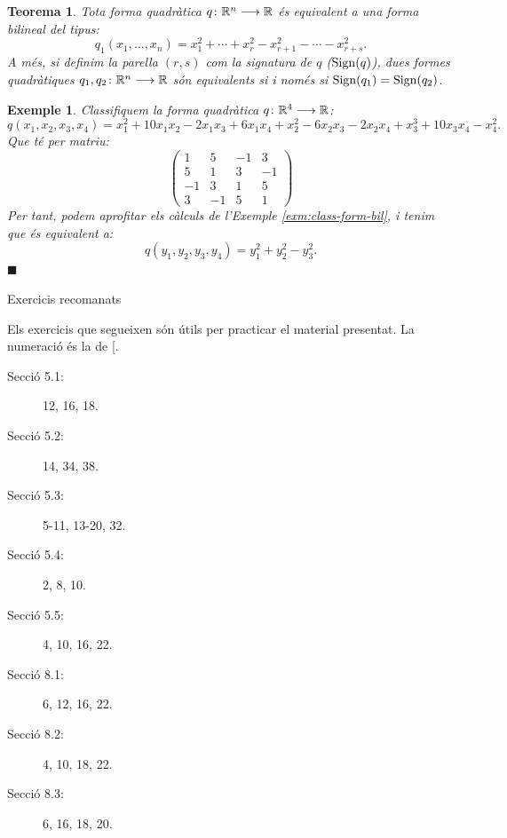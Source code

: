 \documentclass[
  11pt,
]{book}
\makeatletter
\numberwithin{dummy}{section}
\theoremstyle{maincolornumbox}
\newtheorem{theorem}{TTTT}[chapter]
\newtheorem{theoremeT}{Teorema}[chapter]
\theoremstyle{blacknumex}
\newtheorem{exampleT}{Exemple}[chapter]
\theoremstyle{blacknumbox}
\theoremstyle{maincolornum}
\renewenvironment{theorem}{\begin{tBox}\begin{theoremeT}}{\end{theoremeT}\end{tBox}}
\newenvironment{example}{\begin{exampleT}}{\hfill{\tiny\ensuremath{\blacksquare}}\end{exampleT}}
\renewcommand{\section}{\@startsection{section}{1}{\z@}
{-4ex \@plus -1ex \@minus -.4ex}
{1ex \@plus.2ex }
{\normalfont\large\sffamily\bfseries}}
\makeatother
\begin{document}
\begin{theorem}
\protect\hypertarget{thm:class-formQuadR}{}\label{thm:class-formQuadR}Tota forma
quadràtica \(q\colon \mathbb{R}^n\longrightarrow \mathbb{R}\) és equivalent a una forma bilineal del
tipus:
\[q_1(x_1,\dots, x_n)=x_1^2+ \cdots + x_r^2 - x_{r+1}^2-\cdots -x_{r+s}^2 .\]
A més, si definim la parella \((r,s)\) com la \emph{signatura de \(q\)}
(\(\operatorname{Sign}(q)\)), dues formes quadràtiques \(q_1,q_2\colon \mathbb{R}^n\longrightarrow \mathbb{R}\) són
equivalents si i només si \(\operatorname{Sign}(q_1)=\operatorname{Sign}(q_2)\).
\end{theorem}

\begin{example}
Classifiquem la forma quadràtica \(q\colon \mathbb{R}^4 \longrightarrow \mathbb{R}\):
\[q(x_1,x_2,x_3,x_4)=x_1^2+10 x_1x_2 -2 x_1x_3+6x_1x_4 + x_2^2 -6x_2x_3-2x_2x_4+x_3^3+10x_3x_4-x_4^2.\]
Que té per matriu: \[\left(\begin{array}{rrrr}
1 & 5 & -1 & 3 \\
5 & 1 & 3 & -1 \\
-1 & 3 & 1 & 5 \\
3 & -1 & 5 & 1
\end{array}\right)\] Per tant, podem aprofitar els càlculs de l'Exemple
\ref{exm:class-form-bil}, i tenim que és equivalent a:
\[q(y_1,y_2,y_3,y_4)=y_1^2+y_2^2-y_3^2.\]
\end{example}

\section{Exercicis recomanats}\label{exercicis-recomanats-3}

Els exercicis que segueixen són útils per practicar el material
presentat. La numeració és la de {[}\citeproc{ref-Bret}{1}{]}.

\begin{description}
\item[Secció 5.1:]
12, 16, 18.
\item[Secció 5.2:]
14, 34, 38.
\item[Secció 5.3:]
5-11, 13-20, 32.
\item[Secció 5.4:]
2, 8, 10.
\item[Secció 5.5:]
4, 10, 16, 22.
\item[Secció 8.1:]
6, 12, 16, 22.
\item[Secció 8.2:]
4, 10, 18, 22.
\item[Secció 8.3:]
6, 16, 18, 20.
\end{description}

\nocite{*}
\end{document}
